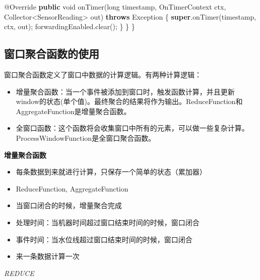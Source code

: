 \documentclass[cn,11pt,chinese]{elegantbook}
\newenvironment{Shaded}{}{}
\newcommand{\AttributeTok}[1]{\textcolor[rgb]{0.49,0.56,0.16}{#1}}
\newcommand{\BuiltInTok}[1]{#1}
\newcommand{\DataTypeTok}[1]{\textcolor[rgb]{0.56,0.13,0.00}{#1}}
\newcommand{\FunctionTok}[1]{\textcolor[rgb]{0.02,0.16,0.49}{#1}}
\newcommand{\KeywordTok}[1]{\textcolor[rgb]{0.00,0.44,0.13}{\textbf{#1}}}
\newcommand{\NormalTok}[1]{#1}
\providecommand{\tightlist}{%
  \setlength{\itemsep}{0pt}\setlength{\parskip}{0pt}}
\begin{document}
\begin{Shaded}
\begin{Highlighting}[]
        \AttributeTok{@Override}
        \KeywordTok{public} \DataTypeTok{void} \FunctionTok{onTimer}\NormalTok{(}\DataTypeTok{long}\NormalTok{ timestamp, OnTimerContext ctx, Collector\textless{}SensorReading\textgreater{} out) }\KeywordTok{throws} \BuiltInTok{Exception}\NormalTok{ \{}
            \KeywordTok{super}\NormalTok{.}\FunctionTok{onTimer}\NormalTok{(timestamp, ctx, out);}
\NormalTok{            forwardingEnabled.}\FunctionTok{clear}\NormalTok{();}
\NormalTok{        \}}
\NormalTok{    \}}
\NormalTok{\}}
\end{Highlighting}
\end{Shaded}

\hypertarget{ux7a97ux53e3ux805aux5408ux51fdux6570ux7684ux4f7fux7528}{%
\subsection{窗口聚合函数的使用}\label{ux7a97ux53e3ux805aux5408ux51fdux6570ux7684ux4f7fux7528}}

窗口聚合函数定义了窗口中数据的计算逻辑。有两种计算逻辑：

\begin{itemize}
\tightlist
\item
  增量聚合函数：当一个事件被添加到窗口时，触发函数计算，并且更新window的状态(单个值)。最终聚合的结果将作为输出。ReduceFunction和AggregateFunction是增量聚合函数。
\item
  全窗口函数：这个函数将会收集窗口中所有的元素，可以做一些复杂计算。ProcessWindowFunction是全窗口聚合函数。
\end{itemize}

\textbf{增量聚合函数}

\begin{itemize}
\tightlist
\item
  每条数据到来就进行计算，只保存一个简单的状态（累加器）
\item
  ReduceFunction, AggregateFunction
\item
  当窗口闭合的时候，增量聚合完成
\item
  处理时间：当机器时间超过窗口结束时间的时候，窗口闭合
\item
  事件时间：当水位线超过窗口结束时间的时候，窗口闭合
\item
  来一条数据计算一次
\end{itemize}

\emph{REDUCE}
\end{document}
